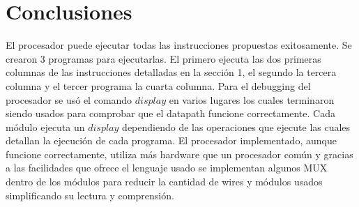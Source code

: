 \documentclass[12pt,a4paper]{article}
\begin{document}
\newpage

\section{Conclusiones}
El procesador puede ejecutar todas las instrucciones propuestas exitosamente. Se crearon 3 programas para ejecutarlas. El primero ejecuta las dos primeras columnas de las instrucciones detalladas en la sección 1, el segundo la tercera columna y el tercer programa la cuarta columna. Para el debugging del procesador se usó el comando $display$ en varios lugares los cuales terminaron siendo usados para comprobar que el datapath funcione correctamente. Cada módulo ejecuta un $display$ dependiendo de las operaciones que ejecute las cuales detallan la ejecución de cada programa. El procesador implementado, aunque funcione correctamente, utiliza más hardware que un procesador común y gracias a las facilidades que ofrece el lenguaje usado se implementan algunos MUX dentro de los módulos  para reducir la cantidad de wires y módulos usados simplificando su lectura y comprensión.
\end{document}
